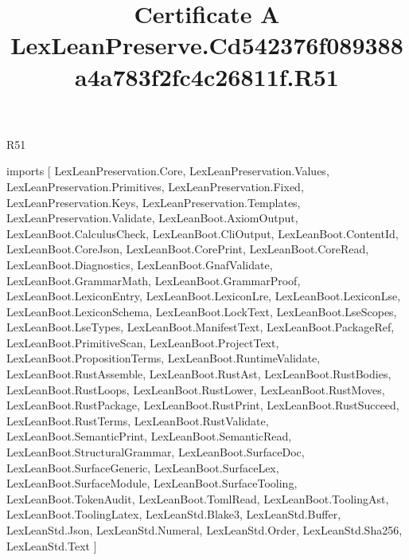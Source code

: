 \begin{lexlean}{R51}
\title{Certificate A LexLeanPreserve.Cd542376f089388a4a783f2fc4c26811f.R51}
\begin{coremodule}
imports [
  LexLeanPreservation.Core,
  LexLeanPreservation.Values,
  LexLeanPreservation.Primitives,
  LexLeanPreservation.Fixed,
  LexLeanPreservation.Keys,
  LexLeanPreservation.Templates,
  LexLeanPreservation.Validate,
  LexLeanBoot.AxiomOutput,
  LexLeanBoot.CalculusCheck,
  LexLeanBoot.CliOutput,
  LexLeanBoot.ContentId,
  LexLeanBoot.CoreJson,
  LexLeanBoot.CorePrint,
  LexLeanBoot.CoreRead,
  LexLeanBoot.Diagnostics,
  LexLeanBoot.GnafValidate,
  LexLeanBoot.GrammarMath,
  LexLeanBoot.GrammarProof,
  LexLeanBoot.LexiconEntry,
  LexLeanBoot.LexiconLre,
  LexLeanBoot.LexiconLse,
  LexLeanBoot.LexiconSchema,
  LexLeanBoot.LockText,
  LexLeanBoot.LseScopes,
  LexLeanBoot.LseTypes,
  LexLeanBoot.ManifestText,
  LexLeanBoot.PackageRef,
  LexLeanBoot.PrimitiveScan,
  LexLeanBoot.ProjectText,
  LexLeanBoot.PropositionTerms,
  LexLeanBoot.RuntimeValidate,
  LexLeanBoot.RustAssemble,
  LexLeanBoot.RustAst,
  LexLeanBoot.RustBodies,
  LexLeanBoot.RustLoops,
  LexLeanBoot.RustLower,
  LexLeanBoot.RustMoves,
  LexLeanBoot.RustPackage,
  LexLeanBoot.RustPrint,
  LexLeanBoot.RustSucceed,
  LexLeanBoot.RustTerms,
  LexLeanBoot.RustValidate,
  LexLeanBoot.SemanticPrint,
  LexLeanBoot.SemanticRead,
  LexLeanBoot.StructuralGrammar,
  LexLeanBoot.SurfaceDoc,
  LexLeanBoot.SurfaceGeneric,
  LexLeanBoot.SurfaceLex,
  LexLeanBoot.SurfaceModule,
  LexLeanBoot.SurfaceTooling,
  LexLeanBoot.TokenAudit,
  LexLeanBoot.TomlRead,
  LexLeanBoot.ToolingAst,
  LexLeanBoot.ToolingLatex,
  LexLeanStd.Blake3,
  LexLeanStd.Buffer,
  LexLeanStd.Json,
  LexLeanStd.Numeral,
  LexLeanStd.Order,
  LexLeanStd.Sha256,
  LexLeanStd.Text
]


\end{coremodule}
\end{lexlean}
